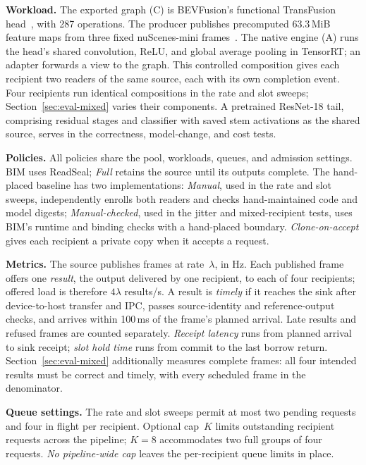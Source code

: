 \documentclass[conference]{IEEEtran}
\newcommand{\MiB}{\,MiB}
\newcommand{\ms}{\,ms}
\begin{document}
\textbf{Workload.} The exported graph (C) is BEVFusion's functional TransFusion head~\cite{bevfusion,transfusion}, with 287 operations. The producer publishes precomputed 63.3\MiB{} feature maps from three fixed nuScenes-mini frames~\cite{nuscenes}. The native engine (A) runs the head's shared convolution, ReLU, and global average pooling in TensorRT; an adapter forwards a view to the graph. This controlled composition gives each recipient two readers of the same source, each with its own completion event. Four recipients run identical compositions in the rate and slot sweeps; Section~\ref{sec:eval-mixed} varies their components. A pretrained ResNet-18 tail, comprising residual stages and classifier with saved stem activations as the shared source, serves in the correctness, model-change, and cost tests.

\textbf{Policies.} All policies share the pool, workloads, queues, and admission settings. BIM uses ReadSeal; \emph{Full} retains the source until its outputs complete. The hand-placed baseline has two implementations: \emph{Manual}, used in the rate and slot sweeps, independently enrolls both readers and checks hand-maintained code and model digests; \emph{Manual-checked}, used in the jitter and mixed-recipient tests, uses BIM's runtime and binding checks with a hand-placed boundary. \emph{Clone-on-accept} gives each recipient a private copy when it accepts a request.

\textbf{Metrics.} The source publishes frames at rate~$\lambda$, in Hz. Each published frame offers one \emph{result}, the output delivered by one recipient, to each of four recipients; offered load is therefore $4\lambda$ results/s. A result is \emph{timely} if it reaches the sink after device-to-host transfer and IPC, passes source-identity and reference-output checks, and arrives within 100\ms{} of the frame's planned arrival. Late results and refused frames are counted separately. \emph{Receipt latency} runs from planned arrival to sink receipt; \emph{slot hold time} runs from commit to the last borrow return. Section~\ref{sec:eval-mixed} additionally measures complete frames: all four intended results must be correct and timely, with every scheduled frame in the denominator.

\textbf{Queue settings.} The rate and slot sweeps permit at most two pending requests and four in flight per recipient. Optional cap~$K$ limits outstanding recipient requests across the pipeline; $K{=}8$ accommodates two full groups of four requests. \emph{No pipeline-wide cap} leaves the per-recipient queue limits in place.
\end{document}
